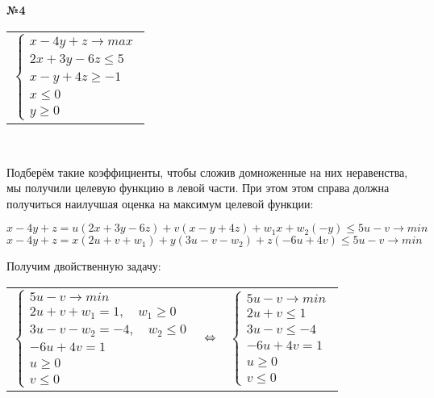 \documentclass{article}
\newenvironment{task}{\begin{center}\fontsize{14}{14}\selectfont\bf}{\rm\fontsize{12}{12}\selectfont\end{center}}
\begin{document}
	\begin{task} 
		№4
	\end{task}
	\begin{center}
		\begin{tabular}{c}
			$\begin{cases}
			x-4y+z \rightarrow max \\
			2x+3y-6z \leq 5 \\
			x-y+4z \geq -1 \\
			x \leq 0 \\
			y \geq 0
			\end{cases}$
		\end{tabular}\\
	\end{center}
	Подберём такие коэффициенты, чтобы сложив домноженные на них неравенства, мы получили целевую функцию в левой части. При этом этом справа должна получиться наилучшая оценка на максимум целевой функции:
	\begin{center}
		$x-4y+z = u(2x+3y-6z) + v(x-y+4z) + w_1 x + w_2 (-y) \leq 5u-v \rightarrow min$ \\
		$x-4y+z = x(2u+v+w_1) + y(3u-v-w_2) + z(-6u+4v) \leq 5u-v \rightarrow min$ \\
	\end{center}
	Получим двойственную задачу:
	\begin{center}
		\begin{tabular}{ccc}
			$\begin{cases}
			5u-v \rightarrow min \\
			2u+v+w_1 = 1, \quad w_1 \geq 0 \\
			3u-v-w_2 = -4, \quad w_2 \leq 0 \\
			-6u+4v = 1 \\
			u \geq 0 \\
			v \leq 0
			\end{cases}$
			& $\hfill \Leftrightarrow \hfill$ &
			$\begin{cases}
			5u-v \rightarrow min \\
			2u+v \leq 1 \\
			3u-v \leq -4 \\
			-6u+4v = 1 \\
			u \geq 0 \\
			v \leq 0
			\end{cases}$
		\end{tabular}\\
	\end{center}
\end{document}

